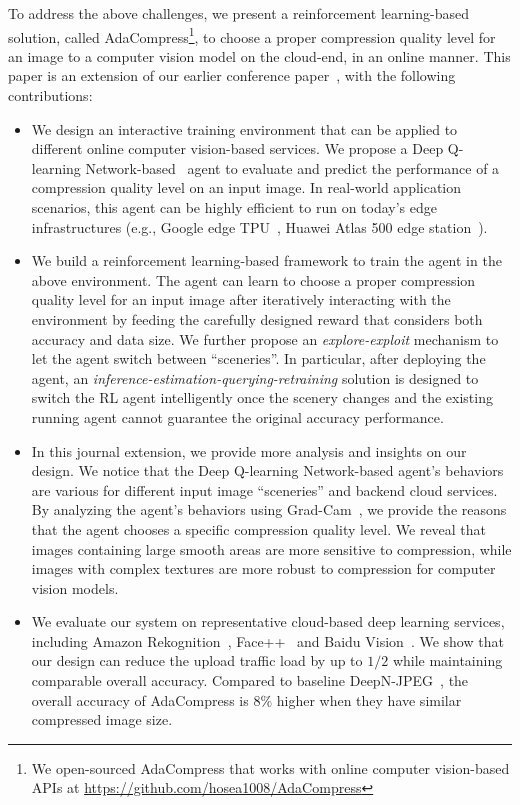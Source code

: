 To address the above challenges, we present a reinforcement learning-based solution, called AdaCompress\footnote{We open-sourced AdaCompress that works with online computer vision-based APIs at \url{https://github.com/hosea1008/AdaCompress}}, to choose a proper compression quality level for an image to a computer vision model on the cloud-end, in an online manner. This paper is an extension of our earlier conference paper~\cite{2019adacompress}, with the following contributions:

\begin{itemize}
	
\item We design an interactive training environment that can be applied to different online computer vision-based services. We propose a Deep Q-learning Network-based~\cite{DQN} agent to evaluate and predict the performance of a compression quality level on an input image. In real-world application scenarios, this agent can be highly efficient to run on today's edge infrastructures (e.g., Google edge TPU~\cite{google-tpu}, Huawei Atlas 500 edge station~\cite{huawei-atlas500}).
\item We build a reinforcement learning-based framework to train the agent in the above environment. The agent can learn to choose a proper compression quality level for an input image after iteratively interacting with the environment by feeding the carefully designed reward that considers both accuracy and data size. We further propose an \emph{explore-exploit} mechanism to let the agent switch between ``sceneries''. In particular, after deploying the agent, an \emph{inference-estimation-querying-retraining} solution is designed to switch the RL agent intelligently once the scenery changes and the existing running agent cannot guarantee the original accuracy performance.
	
\item In this journal extension, we provide more analysis and insights on our design. We notice that the Deep Q-learning Network-based agent's behaviors are various for different input image “sceneries” and backend cloud services. By analyzing the agent's behaviors using Grad-Cam~\cite{grad-cam}, we provide the reasons that the agent chooses a specific compression quality level. We reveal that images containing large smooth areas are more sensitive to compression, while images with complex textures are more robust to compression for computer vision models.
	
\item We evaluate our system on representative cloud-based deep learning services, including Amazon Rekognition~\cite{amazon_rekognition}, Face++~\cite{face++_service} and Baidu Vision~\cite{baidu_vision}. We show that our design can reduce the upload traffic load by up to $1/2$ while maintaining comparable overall accuracy. Compared to baseline DeepN-JPEG~\cite{DeepN-JPEG}, the overall accuracy of AdaCompress is $8\%$ higher when they have similar compressed image size.
\end{itemize}
